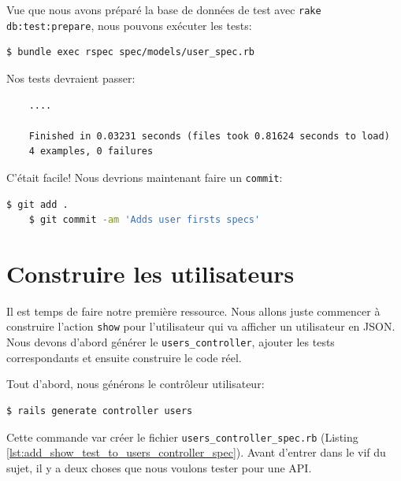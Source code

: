 \documentclass[]{report}
\begin{document}
    Vue que nous avons préparé la base de données de test avec \verb|rake db:test:prepare|, nous pouvons exécuter les tests:


    \begin{scriptsize}
    \begin{lstlisting}[language=bash]
    $ bundle exec rspec spec/models/user_spec.rb
    \end{lstlisting}
    \end{scriptsize}

    Nos tests devraient passer:

    \begin{scriptsize}
    \begin{lstlisting}
    ....

    Finished in 0.03231 seconds (files took 0.81624 seconds to load)
    4 examples, 0 failures
    \end{lstlisting}
    \end{scriptsize}

    C'était facile! Nous devrions maintenant faire un \verb|commit|:

    \begin{scriptsize}
    \begin{lstlisting}[language=bash]
    $ git add .
    $ git commit -am 'Adds user firsts specs'
    \end{lstlisting}
    \end{scriptsize}

  \section{Construire les utilisateurs}

    Il est temps de faire notre première ressource. Nous allons juste commencer à construire l'action \verb|show| pour l'utilisateur qui va afficher un utilisateur en JSON. Nous devons d'abord générer le \verb|users_controller|, ajouter les tests correspondants et ensuite construire le code réel.

    Tout d'abord, nous générons le contrôleur utilisateur:

    \begin{scriptsize}
    \begin{lstlisting}[language=bash]
    $ rails generate controller users
    \end{lstlisting}
    \end{scriptsize}

    Cette commande var créer le fichier \verb|users_controller_spec.rb| (Listing \ref{lst:add_show_test_to_users_controller_spec}). Avant d'entrer dans le vif du sujet, il y a deux choses que nous voulons tester pour une API.
\end{document}
